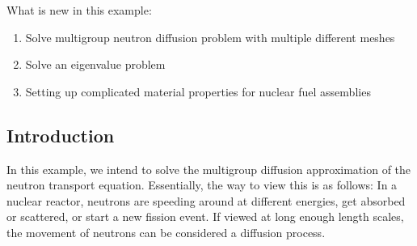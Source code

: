 \documentclass{article}
\begin{document}
What is new in this example:
\begin{enumerate}
\item Solve multigroup neutron diffusion problem with multiple different meshes
\item Solve an eigenvalue problem
\item Setting up complicated material properties for nuclear fuel assemblies
\end{enumerate}

\subsection{Introduction}

In this example, we intend to solve the multigroup diffusion approximation of
the neutron transport equation. Essentially, the way to view this is as follows: In a
nuclear reactor, neutrons are speeding around at different energies, get
absorbed or scattered, or start a new fission
event. If viewed at long enough length scales, the movement of neutrons can be
considered a diffusion process. 
\end{document}
